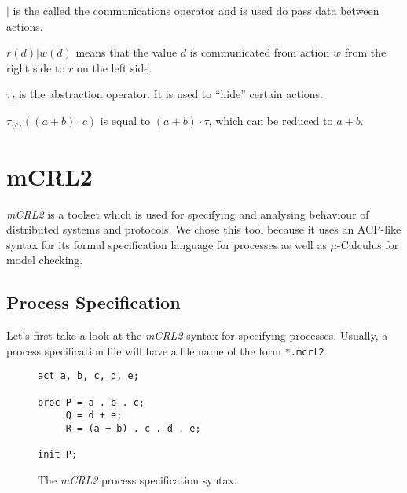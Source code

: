 \documentclass{clseminar}
\begin{document}
  $|$ is the called the communications operator and is used do pass data between actions.
  \\
  \begin{example}
     $r(d) | w(d)$ means that the value $d$ is communicated from action $w$ from the right side to $r$ on the left side.
  \end{example}

  $\tau_I$ is the abstraction operator. It is used to “hide” certain actions.
  \\
  \begin{example}
    $\tau_{\{c\}}((a+b)\cdot c)$ is equal to $(a + b) \cdot \tau$, which can be reduced to $a + b$.
  \end{example}

  \section{mCRL2}

  \textit{mCRL2} is a toolset which is used for specifying and analysing behaviour of distributed systems and protocols. We chose this tool because it uses an ACP-like syntax for its formal specification language for processes as well as $\mu$-Calculus for model checking.

  \subsection{Process Specification}

  Let's first take a look at the \textit{mCRL2} syntax for specifying processes. Usually, a process specification file will have a file name of the form \texttt{*.mcrl2}.

  \begin{figure}[!ht]
    \begin{lstlisting}[language=mCRL2]
act a, b, c, d, e;

proc P = a . b . c;
     Q = d + e;
     R = (a + b) . c . d . e;

init P;
    \end{lstlisting}
    \caption{The \textit{mCRL2} process specification syntax.}
    \label{fig:mcrl2_syntax}
  \end{figure}
\end{document}

